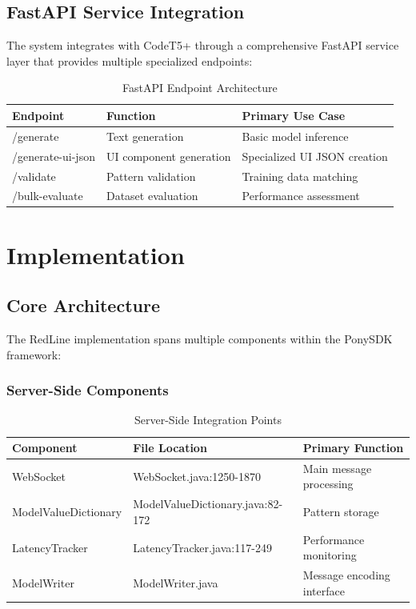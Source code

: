 \documentclass[12pt,a4paper]{article}
\begin{document}
\subsection{FastAPI Service Integration}

The system integrates with CodeT5+ through a comprehensive FastAPI service layer that provides multiple specialized endpoints:

\begin{table}[H]
\centering
\begin{tabular}{|l|l|l|}
\hline
\textbf{Endpoint} & \textbf{Function} & \textbf{Primary Use Case} \\
\hline
/generate & Text generation & Basic model inference \\
/generate-ui-json & UI component generation & Specialized UI JSON creation \\
/validate & Pattern validation & Training data matching \\
/bulk-evaluate & Dataset evaluation & Performance assessment \\
\hline
\end{tabular}
\caption{FastAPI Endpoint Architecture}
\label{tab:fastapi-endpoints}
\end{table}

\section{Implementation}

\subsection{Core Architecture}

The RedLine implementation spans multiple components within the PonySDK framework:

\subsubsection{Server-Side Components}

\begin{table}[H]
\centering
\begin{tabular}{|l|l|l|}
\hline
\textbf{Component} & \textbf{File Location} & \textbf{Primary Function} \\
\hline
WebSocket & WebSocket.java:1250-1870 & Main message processing \\
ModelValueDictionary & ModelValueDictionary.java:82-172 & Pattern storage \\
LatencyTracker & LatencyTracker.java:117-249 & Performance monitoring \\
ModelWriter & ModelWriter.java & Message encoding interface \\
\hline
\end{tabular}
\caption{Server-Side Integration Points}
\label{tab:server-components}
\end{table}
\end{document}
